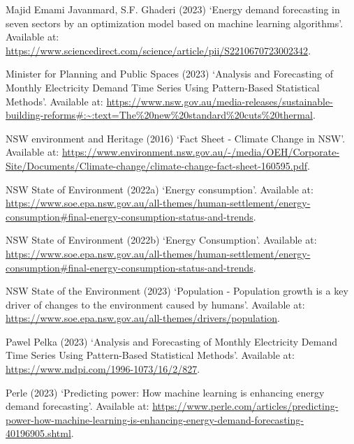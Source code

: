 \documentclass[mstat,12pt]{unswthesis}
\begin{document}
\begin{CSLReferences}{0}{0}
\leavevmode{}%
Majid Emami Javanmard, S.F. Ghaderi (2023) {`{Energy demand forecasting
in seven sectors by an optimization model based on machine learning
algorithms}'}. Available at:
\url{https://www.sciencedirect.com/science/article/pii/S2210670723002342}.

\leavevmode{}%
Minister for Planning and Public Spaces (2023) {`{Analysis and
Forecasting of Monthly Electricity Demand Time Series Using
Pattern-Based Statistical Methods}'}. Available at:
\url{https://www.nsw.gov.au/media-releases/sustainable-building-reforms\#:~:text=The\%20new\%20standard\%20cuts\%20thermal}.

\leavevmode{}%
NSW environment and Heritage (2016) {`{Fact Sheet - Climate Change in
NSW}'}. Available at:
\url{https://www.environment.nsw.gov.au/-/media/OEH/Corporate-Site/Documents/Climate-change/climate-change-fact-sheet-160595.pdf}.

\leavevmode{}%
NSW State of Environment (2022a) {`Energy consumption'}. Available at:
\url{https://www.soe.epa.nsw.gov.au/all-themes/human-settlement/energy-consumption\#final-energy-consumption-status-and-trends}.

\leavevmode{}%
NSW State of Environment (2022b) {`{Energy Consumption}'}. Available at:
\url{https://www.soe.epa.nsw.gov.au/all-themes/human-settlement/energy-consumption\#final-energy-consumption-status-and-trends}.

\leavevmode{}%
NSW State of the Environment (2023) {`{Population - Population growth is
a key driver of changes to the environment caused by humans}'}.
Available at:
\url{https://www.soe.epa.nsw.gov.au/all-themes/drivers/population}.

\leavevmode{}%
Pawel Pelka (2023) {`{Analysis and Forecasting of Monthly Electricity
Demand Time Series Using Pattern-Based Statistical Methods}'}. Available
at: \url{https://www.mdpi.com/1996-1073/16/2/827}.

\leavevmode{}%
Perle (2023) {`Predicting power: How machine learning is enhancing
energy demand forecasting'}. Available at:
\url{https://www.perle.com/articles/predicting-power-how-machine-learning-is-enhancing-energy-demand-forecasting-40196905.shtml}.


\end{CSLReferences}
\end{document}
